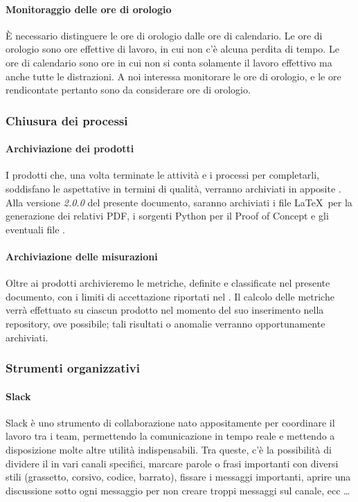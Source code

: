 		\paragraph{Monitoraggio delle ore di orologio}
		È necessario distinguere le ore di orologio dalle ore di calendario. Le ore di orologio sono ore effettive di lavoro, in
		cui non c'è alcuna perdita di tempo. Le ore di calendario sono ore in cui non si conta solamente il lavoro effettivo
		ma anche tutte le distrazioni. A noi interessa monitorare le ore di orologio, e le ore rendicontate pertanto sono da
		considerare ore di orologio.

		\subsubsection{Chiusura dei processi}

    		\paragraph{Archiviazione dei prodotti}
			I prodotti che, una volta terminate le attività e i processi per completarli, soddisfano le aspettative in termini di qualità,
			verranno archiviati in apposite . Alla versione \textit{2.0.0} del presente documento, saranno archiviati
			i file \LaTeX\ per la generazione dei relativi PDF, i sorgenti Python per il Proof of Concept e gli eventuali file .

    		\paragraph{Archiviazione delle misurazioni}
			Oltre ai prodotti archivieremo le metriche, definite e classificate nel presente documento, con i limiti di accettazione riportati nel \Doc{\PdQv}.
			Il calcolo delle metriche verrà effettuato su ciascun prodotto nel momento del suo inserimento nella repository, ove possibile; tali risultati
			o anomalie verranno opportunamente archiviati.


    	\subsubsection{Strumenti organizzativi}\label{PianificazioneCoordinamento}

    		\paragraph{Slack}
			Slack è uno strumento di collaborazione nato appositamente per coordinare il lavoro tra i team, permettendo la comunicazione in tempo
			reale e mettendo a disposizione molte altre utilità indispensabili. Tra queste, c'è la possibilità di dividere il 
			in vari canali specifici, marcare parole o frasi importanti con diversi stili (grassetto, corsivo, codice, barrato), fissare i messaggi
			importanti, aprire una discussione sotto ogni messaggio per non creare troppi messaggi sul canale, ecc \dots

